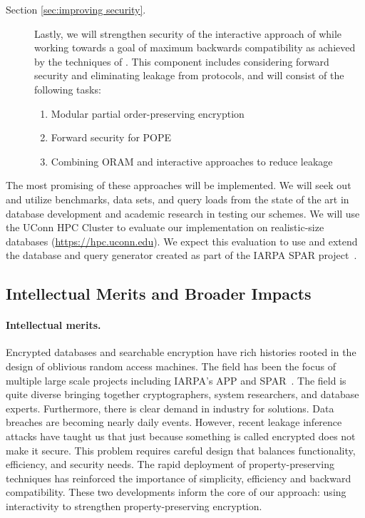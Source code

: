 \begin{description}
\item[Section \ref{sec:improving security}.] Lastly, we will strengthen
security of the interactive approach of 
while working towards a goal of maximum
backwards compatibility as achieved by the techniques of .
This component includes considering forward
security and eliminating leakage from protocols, and will
consist of the following tasks:
\begin{enumerate}\setlength\itemsep{0em}
\item Modular partial order-preserving encryption
\item Forward security for POPE
\item Combining ORAM and interactive approaches to reduce leakage
\end{enumerate}
\end{description}
The most promising of these approaches will be implemented.
We will seek out and utilize benchmarks, data sets, and query loads from
the state of the art in database development and academic research in
testing our schemes.
We will use the UConn HPC Cluster to evaluate our
implementation on realistic-size databases (\url{https://hpc.uconn.edu}).
We expect this evaluation
to use and extend the database and query generator created as part of
the IARPA SPAR project~\cite{varia2015automated}.

\subsection{Intellectual Merits and Broader Impacts}
\paragraph{Intellectual merits.}  
Encrypted databases and searchable encryption have rich histories rooted in the
design of oblivious random access machines.  The field has been the focus of multiple large scale projects including IARPA's APP and SPAR~\cite{spar_baa}.  The field is quite diverse bringing together cryptographers, system researchers, and database experts.  Furthermore, there is clear demand in industry for solutions.  Data breaches are becoming nearly daily events.  However, recent
leakage inference attacks have taught us that just because something is called encrypted does not make it secure.  This problem requires careful design that balances functionality, efficiency, and security needs.  The rapid deployment of property-preserving
techniques has reinforced the importance of simplicity, efficiency and backward
compatibility.  These two developments inform the core of our approach: using
interactivity to strengthen property-preserving encryption.

